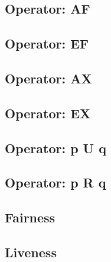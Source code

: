 \documentclass{article}
\begin{document}
\subsection{Operator: AF}

\subsection{Operator: EF}

\subsection{Operator: AX}

\subsection{Operator: EX}

\subsection{Operator: p U q}

\subsection{Operator: p R q}

\subsection{Fairness}

\subsection{Liveness}

\newpage

\newpage


\end{document}
